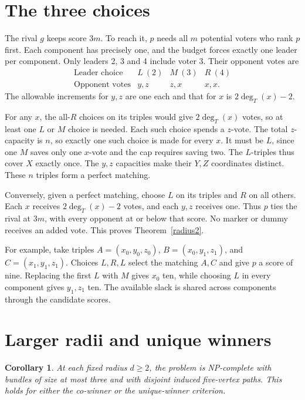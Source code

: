 \documentclass[11pt,a4paper]{amsart}
\newtheorem{corollary}[theorem]{Corollary}
\begin{document}
\section{The three choices}

The rival \(g\) keeps score \(3m\). To reach it, \(p\) needs all \(m\) potential voters who rank \(p\) first. Each component has precisely one, and the budget forces exactly one leader per component. Only leaders 2, 3 and 4 include voter 3. Their opponent votes are
\[
\begin{array}{c|ccc}
\text{Leader choice} & L\ (2)&M\ (3)&R\ (4)\\ \hline
\text{Opponent votes}&y,z&z,x&x,x .
\end{array}
\]
The allowable increments for \(y,z\) are one each and that for \(x\) is \(2\deg_T(x)-2\).

For any \(x\), the all-\(R\) choices on its triples would give \(2\deg_T(x)\) votes, so at least one \(L\) or \(M\) choice is needed. Each such choice spends a \(z\)-vote. The total \(z\)-capacity is \(n\), so exactly one such choice is made for every \(x\). It must be \(L\), since one \(M\) saves only one \(x\)-vote and the cap requires saving two. The \(L\)-triples thus cover \(X\) exactly once. The \(y,z\) capacities make their \(Y,Z\) coordinates distinct. These \(n\) triples form a perfect matching.

Conversely, given a perfect matching, choose \(L\) on its triples and \(R\) on all others. Each \(x\) receives \(2\deg_T(x)-2\) votes, and each \(y,z\) receives one. Thus \(p\) ties the rival at \(3m\), with every opponent at or below that score. No marker or dummy receives an added vote. This proves Theorem~\ref{radius2}.

For example, take triples \(A=(x_0,y_0,z_0)\), \(B=(x_0,y_1,z_1)\), and \(C=(x_1,y_1,z_1)\). Choices \(L,R,L\) select the matching \(A,C\) and give \(p\) a score of nine. Replacing the first \(L\) with \(M\) gives \(x_0\) ten, while choosing \(L\) in every component gives \(y_1,z_1\) ten. The available slack is shared across components through the candidate scores.

\section{Larger radii and unique winners}

\begin{corollary}\label{extension}
At each fixed radius \(d\ge2\), the problem is NP-complete with bundles of size at most three and with disjoint induced five-vertex paths. This holds for either the co-winner or the unique-winner criterion.
\end{corollary}
\end{document}
